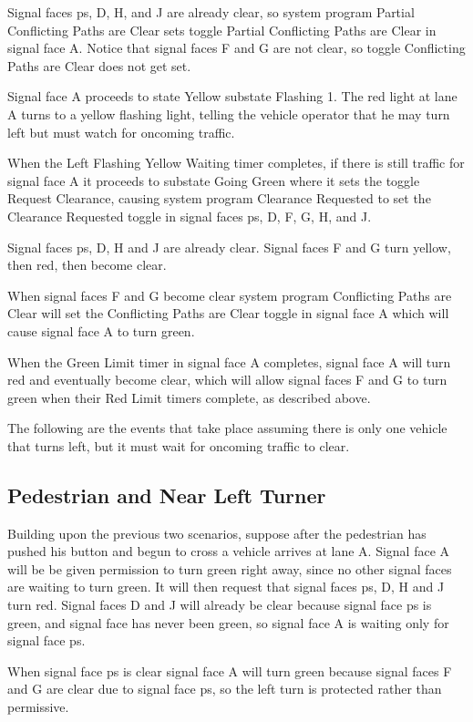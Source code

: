 \documentclass[letterpaper,twoside]{article}
\begin{document}
Signal faces ps, D, H, and J are already clear, so system program Partial
Conflicting Paths are Clear sets toggle Partial Conflicting Paths are Clear
in signal face A.
Notice that signal faces F and G are not clear, so toggle Conflicting Paths
are Clear does not get set.

Signal face A proceeds to state Yellow substate Flashing 1.  The red light
at lane A turns to a yellow flashing light, telling the vehicle operator
that he may turn left but must watch for oncoming traffic.

When the Left Flashing Yellow Waiting timer completes, if there is still
traffic for
signal face A it proceeds to substate Going Green where it sets the
toggle Request Clearance, causing system program Clearance Requested to
set the Clearance Requested toggle in signal faces ps, D, F, G, H, and J.

Signal faces ps, D, H and J are already clear.  Signal faces F and G turn
yellow, then red, then become clear.

When signal faces F and G become clear system program Conflicting Paths
are Clear will set the Conflicting Paths are Clear toggle in signal face
A which will cause signal face A to turn green.

When the Green Limit timer in signal face A completes, signal face
A will turn red and eventually become clear, which will allow
signal faces F and G to turn green when their Red Limit timers complete,
as described above.

The following are the events that take place assuming there is only
one vehicle that turns left, but it must wait for oncoming traffic
to clear.



\subsection{Pedestrian and Near Left Turner}

Building upon the previous two scenarios, suppose after the pedestrian
has pushed his button and begun to cross a vehicle arrives at lane A.
Signal face A will be be given permission to turn green right away, since no
other signal faces are waiting to turn green.  It will then request
that signal faces ps, D, H and J turn red.  Signal faces D and J
will already be clear because signal face ps is green, and signal face
has never been green, so signal face A is waiting only for signal face ps.

When signal face ps is clear signal face A will turn green because
signal faces F and G are clear due to signal face ps, so the left turn
is protected rather than permissive.
\end{document}
